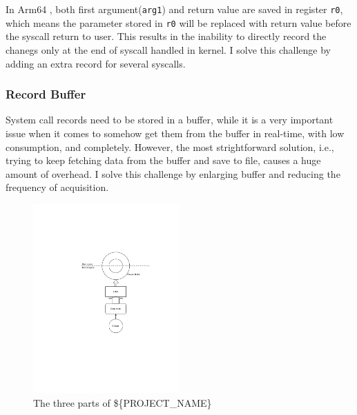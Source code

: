 In Arm64 \cite{syscall}, both first argument(\texttt{arg1}) and return value are saved in register \texttt{r0}, which means the parameter stored in \texttt{r0} will be replaced with return value before the syscall return to user. This results in the inability to directly record the chanegs only at the end of syscall handled in kernel. I solve this challenge by adding an extra record for several syscalls.




\subsubsection{Record Buffer}

System call records need to be stored in a buffer, while it is a very important issue when it comes to somehow get them from the buffer in real-time, with low consumption, and completely. However, the most strightforward solution, i.e., trying to keep fetching data from the buffer and save to file, causes a huge amount of overhead. I solve this challenge by enlarging buffer and reducing the frequency of acquisition.





\begin{figure}
    \centering
    \includegraphics[width=0.5\textwidth]{figures/arch.pdf}
    \caption{The three parts of \$\{PROJECT\_NAME\}}
    \label{fig:arch}
\end{figure}



